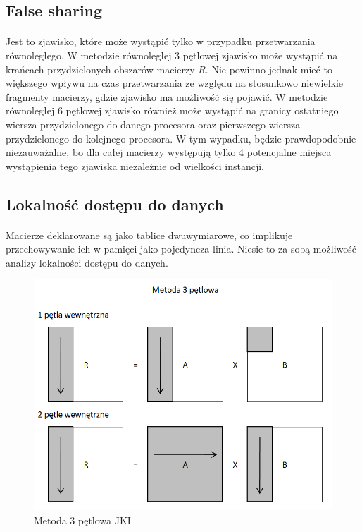 \documentclass{scrartcl}
\begin{document}
\subsection{False sharing}
\paragraph{}Jest to zjawisko, które może wystąpić tylko w przypadku przetwarzania równoległego. W metodzie równoległej 3 pętlowej zjawisko może wystąpić na krańcach przydzielonych obszarów macierzy $R$. Nie powinno jednak mieć to większego wpływu na czas przetwarzania ze względu na stosunkowo niewielkie fragmenty macierzy, gdzie zjawisko ma możliwość się pojawić.
W metodzie równoległej 6 pętlowej zjawisko również może wystąpić na granicy ostatniego wiersza przydzielonego do danego procesora oraz pierwszego wiersza przydzielonego do kolejnego procesora. W tym wypadku, będzie prawdopodobnie niezauważalne, bo dla całej macierzy występują tylko 4 potencjalne miejsca wystąpienia tego zjawiska niezależnie od wielkości instancji.
\subsection{Lokalność dostępu do danych}
\paragraph{}Macierze deklarowane są jako tablice dwuwymiarowe, co implikuje przechowywanie ich w pamięci jako pojedyncza linia. Niesie to za sobą możliwość analizy lokalności dostępu do danych.
\begin{figure}[H]
\includegraphics[width=\textwidth]{3petlowa.png}
\caption{Metoda 3 pętlowa JKI}
\end{figure}
\end{document}
